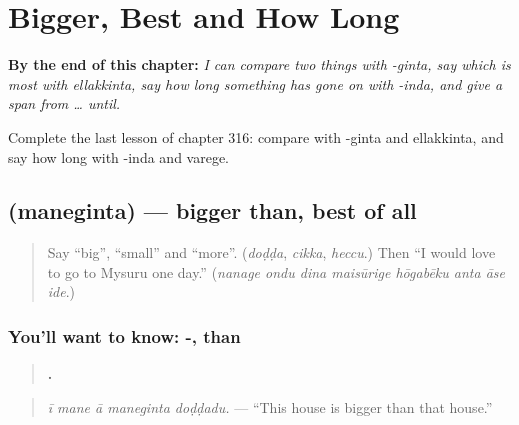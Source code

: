 
\chapter{Bigger, Best and How Long}
\label{ch:ka-bigger-best-and-how-long}

\begin{chapteropening}
\textbf{By the end of this chapter:} \emph{I can compare two things with -ginta, say which is most with ellakkinta, say how long something has gone on with -inda, and give a span from … until.}

Complete the last lesson of chapter 316: compare with -ginta and ellakkinta, and say how long with -inda and varege.
\end{chapteropening}

\section[\texorpdfstring{\kn{ಮನೆಗಿಂತ} (maneginta)}{ಮನೆಗಿಂತ (maneginta)}]{ (maneginta) — bigger than, best of all}

\label{lesson:KA-C316-maneginta}



\begin{quote}
Say \textquotedblleft{}big\textquotedblright{}, \textquotedblleft{}small\textquotedblright{} and \textquotedblleft{}more\textquotedblright{}. (\emph{doḍḍa}, \emph{cikka}, \emph{heccu}.) Then \textquotedblleft{}I would love to go to Mysuru one day.\textquotedblright{} (\emph{nanage ondu dina maisūrige hōgabēku anta āse ide}.)
\end{quote}

\subsection*{You'll want to know: -, than}
\begin{quote}
\textbf{    .}
\end{quote}

\begin{quote}
\emph{ī mane ā maneginta doḍḍadu.} — \textquotedblleft{}This house is bigger than that house.\textquotedblright{}
\end{quote}

